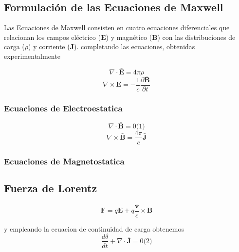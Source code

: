 \documentclass{article}
\begin{document}
\subsection{Formulación de las Ecuaciones de Maxwell}
Las Ecuaciones de Maxwell consisten en cuatro ecuaciones diferenciales que relacionan los campos eléctrico (\(\mathbf{E}\)) y magnético (\(\mathbf{B}\)) con las distribuciones de carga (\(\rho\)) y corriente (\(\mathbf{J}\)). 
	completando las ecuaciones, obtenidas experimentalmente
	
 	\begin{minipage}{.45\textwidth}
		\begin{equation*}
			\nabla\cdot\mathbf{\bar{E}} = 4 \pi \rho
		\end{equation*}
		\begin{equation*}
			\nabla\times\mathbf{\bar{E}} = -\frac{1}{c} \frac{\partial \mathbf{\bar{B}}}{\partial t}
		\end{equation*}
		\subsubsection*{Ecuaciones de Electroestatica}
	\end{minipage}%
	\begin{minipage}{.45\textwidth}
		\begin{equation*}
			\nabla \cdot \mathbf{\bar{B}} = 0 \text{(1)}
		\end{equation*}
		\begin{equation*}
			\nabla \times \mathbf{\bar{B}} = \frac{4\pi}{c} \mathbf{\bar{J}}
		\end{equation*}
		\subsubsection*{Ecuaciones de Magnetostatica}
	\end{minipage}
	
	
	\subsection{Fuerza de Lorentz}
	\[
	\mathbf{\bar{F}} = q\mathbf{\bar{E}} + q\frac{\mathbf{\bar{v}}}{c} \times \mathbf{\bar{B}}
	\]
	
	y empleando la ecuacion de continuidad de carga obtenemos
	\begin{equation*}
		\frac{d\delta}{dt} + \nabla \cdot \mathbf{\bar{J}}=0  \text{(2)}
	\end{equation*}
	
\end{document}
